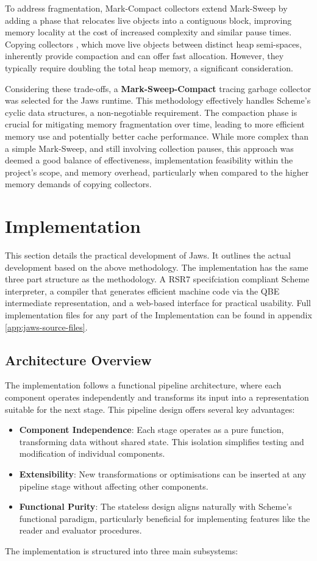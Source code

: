\documentclass[final]{cmpreport_02}
\begin{document}
To address fragmentation, Mark-Compact collectors \cite{JonesHoskingMoss2011} extend Mark-Sweep by adding a phase that relocates live objects into a contiguous block, improving memory locality at the cost of increased complexity and similar pause times. Copying collectors \cite{FenichelYochelson1969, Cheney1970, JonesHoskingMoss2011}, which move live objects between distinct heap semi-spaces, inherently provide compaction and can offer fast allocation. However, they typically require doubling the total heap memory, a significant consideration.\newline

Considering these trade-offs, a \textbf{Mark-Sweep-Compact} tracing garbage collector was selected for the Jaws runtime. This methodology effectively handles Scheme's cyclic data structures, a non-negotiable requirement. The compaction phase is crucial for mitigating memory fragmentation over time, leading to more efficient memory use and potentially better cache performance. While more complex than a simple Mark-Sweep, and still involving collection pauses, this approach was deemed a good balance of effectiveness, implementation feasibility within the project's scope, and memory overhead, particularly when compared to the higher memory demands of copying collectors.
\section{Implementation}
This section details the practical development of Jaws. It outlines the actual development based on the above methodology. The implementation has the same three part structure as the methodology. A RSR7 specifciation compliant Scheme interpreter, a compiler that generates efficient machine code via the QBE intermediate representation, and a web-based interface for practical usability.
Full implementation files for any part of the Implementation can be found in appendix \ref{app:jaws-source-files}.


\subsection{Architecture Overview}
The implementation follows a functional pipeline architecture, where each component operates independently and transforms its input into a representation suitable for the next stage. This pipeline design offers several key advantages:

\begin{itemize}[noitemsep]
\item \textbf{Component Independence}: Each stage operates as a pure function, transforming data without shared state. This isolation simplifies testing and modification of individual components.
\item \textbf{Extensibility}: New transformations or optimisations can be inserted at any pipeline stage without affecting other components.
\item \textbf{Functional Purity}: The stateless design aligns naturally with Scheme's functional paradigm, particularly beneficial for implementing features like the reader and evaluator procedures.
\end{itemize}
The implementation is structured into three main subsystems:
\end{document}
